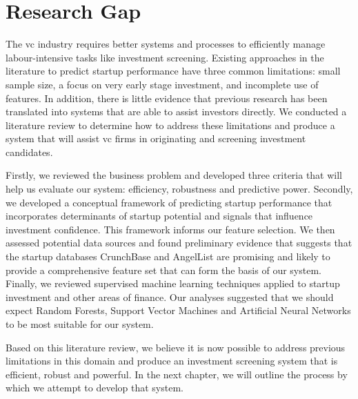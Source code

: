 \documentclass[../thesis/thesis.tex]{subfiles}
\begin{document}
\section{Research Gap}

The \gls{vc} industry requires better systems and processes to efficiently manage labour-intensive tasks like investment screening. Existing approaches in the literature to predict startup performance have three common limitations: small sample size, a focus on very early stage investment, and incomplete use of features. In addition, there is little evidence that previous research has been translated into systems that are able to assist investors directly. We conducted a literature review to determine how to address these limitations and produce a system that will assist \gls{vc} firms in originating and screening investment candidates.

Firstly, we reviewed the business problem and developed three criteria that will help us evaluate our system: efficiency, robustness and predictive power. Secondly, we developed a conceptual framework of predicting startup performance that incorporates determinants of startup potential and signals that influence investment confidence. This framework informs our feature selection. We then assessed potential data sources and found preliminary evidence that suggests that the startup databases CrunchBase and AngelList are promising and likely to provide a comprehensive feature set that can form the basis of our system. Finally, we reviewed supervised machine learning techniques applied to startup investment and other areas of finance. Our analyses suggested that we should expect Random Forests, Support Vector Machines and Artificial Neural Networks to be most suitable for our system.

Based on this literature review, we believe it is now possible to address previous limitations in this domain and produce an investment screening system that is efficient, robust and powerful. In the next chapter, we will outline the process by which we attempt to develop that system.

\end{document}

